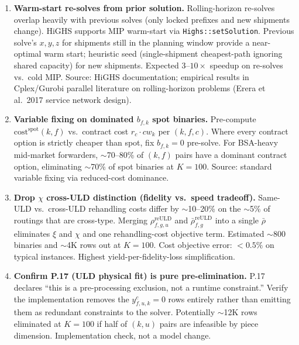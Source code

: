 \documentclass[11pt,a4paper]{article}
\theoremstyle{definition}
\begin{document}
\begin{enumerate}
  \item \label{item:scale-warm-start} \textbf{Warm-start re-solves from prior solution.}
        Rolling-horizon re-solves overlap heavily with previous solves (only locked
        prefixes and new shipments change). HiGHS supports MIP warm-start via
        \texttt{Highs::setSolution}. Previous solve's $x, y, z$ for shipments still in
        the planning window provide a near-optimal warm start; heuristic seed
        (single-shipment cheapest-path ignoring shared capacity) for new shipments.
        Expected $3$--$10\times$ speedup on re-solves vs.\ cold MIP. Source: HiGHS
        documentation; empirical results in Cplex/Gurobi parallel literature on
        rolling-horizon problems (Erera et al.\ 2017 service network design).

  \item \label{item:scale-spot-binary-fixing} \textbf{Variable fixing on dominated $b_{f,k}$ spot binaries.}
        Pre-compute $\text{cost}^{\text{spot}}(k, f)$ vs.\ contract cost $r_c \cdot cw_k$
        per $(k, f, c)$. Where every contract option is strictly cheaper than spot, fix
        $b_{f,k} = 0$ pre-solve. For BSA-heavy mid-market forwarders, $\sim$70--80\% of
        $(k, f)$ pairs have a dominant contract option, eliminating $\sim$70\% of spot
        binaries at $K=100$. Source: standard variable fixing via reduced-cost dominance.

  \item \label{item:scale-drop-chi} \textbf{Drop $\chi$ cross-ULD distinction (fidelity vs.\ speed tradeoff).}
        Same-ULD vs.\ cross-ULD rehandling costs differ by $\sim$10--20\% on the
        $\sim$5\% of routings that are cross-type. Merging
        $\rho^{\text{reULD}}_{f,g,u}$ and $\bar{\rho}^{\text{reULD}}_{f,g}$ into a single
        $\bar{\rho}$ eliminates $\xi$ and $\chi$ and one rehandling-cost objective term.
        Estimated $\sim$800 binaries and $\sim$4K rows out at $K=100$. Cost objective
        error: $<0.5\%$ on typical instances. Highest yield-per-fidelity-loss
        simplification.

  \item \label{item:scale-p17-pre-elim} \textbf{Confirm P.17 (ULD physical fit) is pure pre-elimination.}
        P.17 declares ``this is a pre-processing exclusion, not a runtime constraint.''
        Verify the implementation removes the $y_{f,u,k}^c = 0$ rows entirely rather
        than emitting them as redundant constraints to the solver. Potentially $\sim$12K
        rows eliminated at $K=100$ if half of $(k, u)$ pairs are infeasible by piece
        dimension. Implementation check, not a model change.


\end{enumerate}
\end{document}
